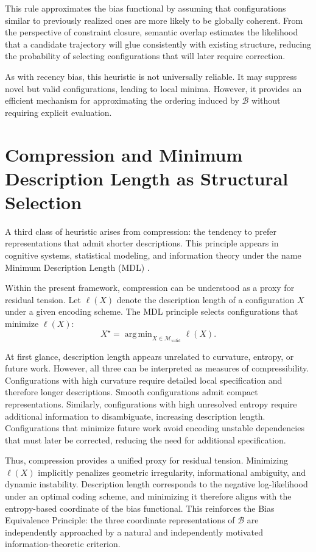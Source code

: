 \documentclass[11pt]{article}
\theoremstyle{plain}
\theoremstyle{definition}
\theoremstyle{remark}
\DeclareMathOperator{\argmin}{arg\,min}
\begin{document}
This rule approximates the bias functional by assuming that configurations similar to previously realized ones are more likely to be globally coherent. From the perspective of constraint closure, semantic overlap estimates the likelihood that a candidate trajectory will glue consistently with existing structure, reducing the probability of selecting configurations that will later require correction.

As with recency bias, this heuristic is not universally reliable. It may suppress novel but valid configurations, leading to local minima. However, it provides an efficient mechanism for approximating the ordering induced by $\mathcal{B}$ without requiring explicit evaluation.

\section{Compression and Minimum Description Length as Structural Selection}

A third class of heuristic arises from compression: the tendency to prefer representations that admit shorter descriptions. This principle appears in cognitive systems, statistical modeling, and information theory under the name Minimum Description Length (MDL) \cite{Jordan1999}.

Within the present framework, compression can be understood as a proxy for residual tension. Let $\ell(X)$ denote the description length of a configuration $X$ under a given encoding scheme. The MDL principle selects configurations that minimize $\ell(X)$:
\[
X^\star = \argmin_{X \in \mathcal{M}_{\mathrm{valid}}} \ell(X).
\]

At first glance, description length appears unrelated to curvature, entropy, or future work. However, all three can be interpreted as measures of compressibility. Configurations with high curvature require detailed local specification and therefore longer descriptions. Smooth configurations admit compact representations. Similarly, configurations with high unresolved entropy require additional information to disambiguate, increasing description length. Configurations that minimize future work avoid encoding unstable dependencies that must later be corrected, reducing the need for additional specification.

Thus, compression provides a unified proxy for residual tension. Minimizing $\ell(X)$ implicitly penalizes geometric irregularity, informational ambiguity, and dynamic instability. Description length corresponds to the negative log-likelihood under an optimal coding scheme, and minimizing it therefore aligns with the entropy-based coordinate of the bias functional. This reinforces the Bias Equivalence Principle: the three coordinate representations of $\mathcal{B}$ are independently approached by a natural and independently motivated information-theoretic criterion.
\end{document}
